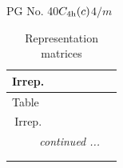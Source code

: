 \documentclass[fleqn,8pt,landscape]{jsarticle}
\begin{document}
\setcounter{MaxMatrixCols}{32}

\renewcommand{\tablename}{Table~}
\renewcommand{\figurename}{Figure~}
\begin{center}
\LARGE
PG No. 40\quad$C_{\rm 4h}(c)$\quad$4/m$\quad[ tetragonal ]
\end{center}
\renewcommand{\arraystretch}{1.2}
\begin{longtable}{ccccccc}
\caption{Representation matrices}
 \\
 \hline \hline
Irrep. &  &  &  &  &  &  \\ \hline \endfirsthead

\multicolumn{6}{l}{\tablename\ \thetable{}} \\
 \hline \hline
Irrep. &  &  &  &  &  &  \\ \hline \endhead

 \hline \hline
\multicolumn{6}{r}{\footnotesize\it continued ...} \\ \endfoot

 \hline \hline
\multicolumn{6}{r}{} \\ \endlastfoot


\end{longtable}
\end{document}
